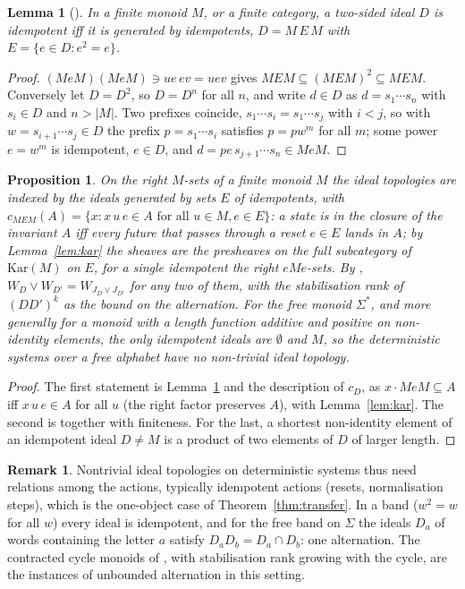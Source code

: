 \documentclass[11pt]{amsart}
\newtheorem{lem}[thm]{Lemma}
\newtheorem{prop}[thm]{Proposition}
\theoremstyle{definition}
\newtheorem{rem}[thm]{Remark}
\begin{document}
\begin{lem}[{\cite[\S2]{Finitejoin}}]\label{lem:idem}
In a finite monoid $M$, or a finite category, a two-sided ideal $D$ is
idempotent iff it is generated by idempotents, $D=M\,E\,M$ with
$E=\{e\in D:e^2=e\}$.
\end{lem}
\begin{proof}
$(MeM)(MeM)\ni ue\,ev=uev$ gives $MEM\subseteq(MEM)^2\subseteq MEM$.
Conversely let $D=D^2$, so $D=D^n$ for all $n$, and write $d\in D$ as
$d=s_1\cdots s_n$ with $s_i\in D$ and $n>|M|$. Two prefixes coincide,
$s_1\cdots s_i=s_1\cdots s_j$ with $i<j$, so with $w=s_{i+1}\cdots s_j\in D$
the prefix $p=s_1\cdots s_i$ satisfies $p=pw^m$ for all $m$; some power
$e=w^m$ is idempotent, $e\in D$, and $d=pe\,s_{j+1}\cdots s_n\in MeM$.
\end{proof}

\begin{prop}\label{prop:monoid}
On the right $M$-sets of a finite monoid $M$ the ideal topologies are
indexed by the ideals generated by sets $E$ of idempotents, with
$c_{MEM}(A)=\{x:x\,u\,e\in A\text{ for all }u\in M,e\in E\}$: a state is in
the closure of the invariant $A$ iff every future that passes through a
reset $e\in E$ lands in $A$; by Lemma~\ref{lem:kar} the sheaves are the
presheaves on the full subcategory of $\mathrm{Kar}(M)$ on $E$, for a
single idempotent the right $eMe$-sets. By \cite{Stabjoin},
$W_D\vee W_{D'}=W_{J_D\vee J_{D'}}$ for any two of them, with the
stabilisation rank of $(DD')^k$ as the bound on the alternation. For the
free monoid $\Sigma^*$, and more generally for a monoid with a length
function additive and positive on non-identity elements, the only
idempotent ideals are $\emptyset$ and $M$, so the deterministic systems
over a free alphabet have no non-trivial ideal topology.
\end{prop}
\begin{proof}
The first statement is Lemma~\ref{lem:idem} and the description of
$c_D$, as $x\cdot MeM\subseteq A$ iff $x\,u\,e\in A$ for all $u$ (the
right factor preserves $A$), with Lemma~\ref{lem:kar}. The second is
\cite{Stabjoin} together with finiteness. For the last, a shortest
non-identity element of an idempotent ideal $D\ne M$ is a product of two
elements of $D$ of larger length.
\end{proof}

\begin{rem}
Nontrivial ideal topologies on deterministic systems thus need relations
among the actions, typically idempotent actions (resets, normalisation
steps), which is the one-object case of Theorem~\ref{thm:transfer}. In a
band ($w^2=w$ for all $w$) every ideal is idempotent, and for the free
band on $\Sigma$ the ideals $D_a$ of words containing the letter $a$
satisfy $D_aD_b=D_a\cap D_b$: one alternation. The contracted cycle
monoids of \cite{Finitejoin}, with stabilisation rank growing with the
cycle, are the instances of unbounded alternation in this setting.
\end{rem}
\end{document}
